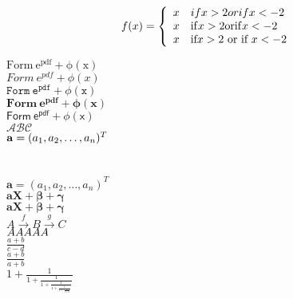 \documentclass[11pt]{article}
\begin{document}
\begin{equation}
f(x) = \left \{ \begin{array}{rl}
x & if x > 2 or if x < -2 \\
x & {\rm if} x > 2 {\rm or if} x < -2 \\
x & \mbox{if} x > 2 \mbox{ or if } x < -2
\end{array} \right.
\end{equation}

$\mathrm{Form\ e^{pdf}+ \phi(x)}$ \\

$\mathit{Form\ e^{pdf}+\phi(x)}$ \\

$\mathtt{Form\ e^{pdf}+\phi(x)}$ \\

$\mathbf{Form\ e^{pdf}+\phi(x)}$ \\

$\mathsf{Form\ e^{pdf}+\phi(x)}$ \\

$\mathcal{ABC}$ \\

${\bf a} = (a_1, a_2, \ldots, a_n)^T$ \\

\unboldmath \\

 \unboldmath \\

$\bm{a}=(a_1, a_2, \ldots, a_n)^T$ \\

$\pmb{aX + \beta + \gamma}$ \\

$\boldsymbol{aX + \beta + \gamma}$ \\

$A\stackrel{f}{\to}B\stackrel{g}{\to}C$ \\ 

$A \small{A} \LARGE{A} \Huge{A} \footnotesize{A}$ \\

${\displaystyle \frac{a+b}{c-d}}$ \\

$\frac{\textstyle a+b}{\displaystyle a+b}$ \\

$\displaystyle 1+\frac{1}{1+\frac{1}{1+\frac{1}{1+\frac{1}{1+\frac{1}{1+x}}}}}$ \\
\end{document}
